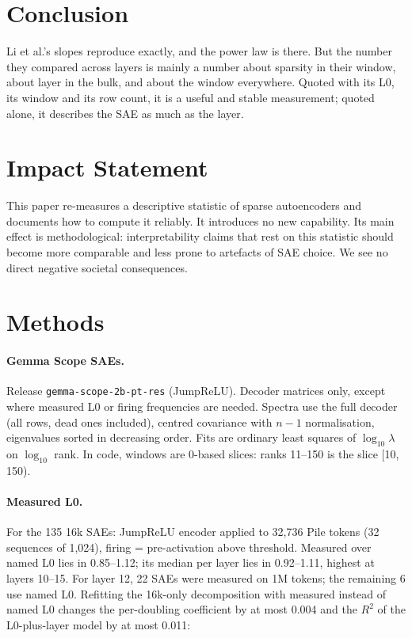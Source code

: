 \documentclass[10pt,twocolumn]{article}
\begin{document}
\section{Conclusion}

Li et al.'s slopes reproduce exactly, and the power law is there. But the number they compared across layers is mainly a number about sparsity in their window, about layer in the bulk, and about the window everywhere. Quoted with its L0, its window and its row count, it is a useful and stable measurement; quoted alone, it describes the SAE as much as the layer.

\section*{Impact Statement}
This paper re-measures a descriptive statistic of sparse autoencoders and documents how to compute it reliably. It introduces no new capability. Its main effect is methodological: interpretability claims that rest on this statistic should become more comparable and less prone to artefacts of SAE choice. We see no direct negative societal consequences.

{\small


}

\clearpage
\onecolumn
\appendix

\section{Methods}
\label{app:methods}

\paragraph{Gemma Scope SAEs.} Release \texttt{gemma-scope-2b-pt-res} (JumpReLU). Decoder matrices only, except where measured L0 or firing frequencies are needed. Spectra use the full decoder (all rows, dead ones included), centred covariance with $n-1$ normalisation, eigenvalues sorted in decreasing order. Fits are ordinary least squares of $\log_{10}\lambda$ on $\log_{10}$ rank. In code, windows are 0-based slices: ranks 11--150 is the slice [10, 150).

\paragraph{Measured L0.} For the 135 16k SAEs: JumpReLU encoder applied to 32,736 Pile tokens (32 sequences of 1,024), firing = pre-activation above threshold. Measured over named L0 lies in 0.85--1.12; its median per layer lies in 0.92--1.11, highest at layers 10--15. For layer 12, 22 SAEs were measured on 1M tokens; the remaining 6 use named L0. Refitting the 16k-only decomposition with measured instead of named L0 changes the per-doubling coefficient by at most 0.004 and the $R^2$ of the L0-plus-layer model by at most 0.011:
\end{document}
